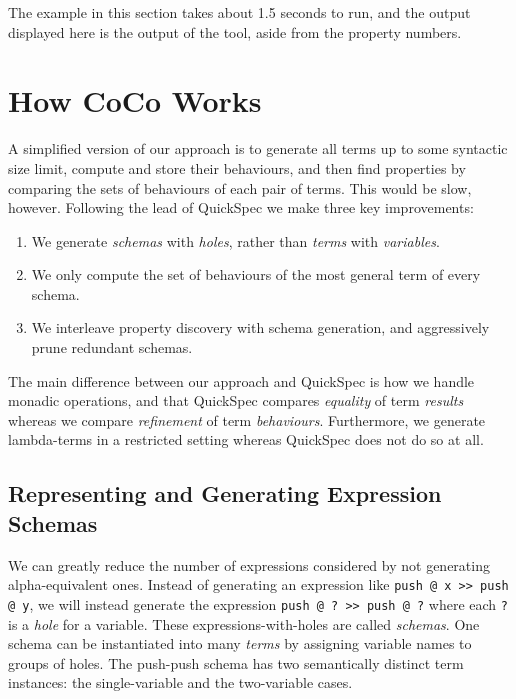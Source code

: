 The example in this section takes about 1.5 seconds to run, and the
output displayed here is the output of the tool, aside from the
property numbers.

\section{How CoCo Works}
\label{sec:coco-hiw}

A simplified version of our approach is to generate all terms up to
some syntactic size limit, compute and store their behaviours, and
then find properties by comparing the sets of behaviours of each pair
of terms.  This would be slow, however.  Following the lead of
QuickSpec\cite{smallbone2017,claessen2010} we make three key
improvements:

\begin{enumerate}
\item We generate \emph{schemas} with \emph{holes}, rather than
  \emph{terms} with \emph{variables}.
\item We only compute the set of behaviours of the most general term
  of every schema.
\item We interleave property discovery with schema generation, and
  aggressively prune redundant schemas.
\end{enumerate}

The main difference between our approach and QuickSpec is how we
handle monadic operations, and that QuickSpec compares \emph{equality}
of term \emph{results} whereas we compare \emph{refinement} of term
\emph{behaviours}.  Furthermore, we generate lambda-terms in a
restricted setting whereas QuickSpec does not do so at all.

\subsection{Representing and Generating Expression Schemas}
\label{sec:coco-hiw-gen}

We can greatly reduce the number of expressions considered by not
generating alpha-equivalent ones.  Instead of generating an expression
like \verb|push @ x >> push @ y|, we will instead generate the
expression \verb|push @ ? >> push @ ?| where each \verb|?| is a
\emph{hole} for a variable.  These expressions-with-holes are called
\emph{schemas}.  One schema can be instantiated into many \emph{terms}
by assigning variable names to groups of holes.  The push-push schema
has two semantically distinct term instances: the single-variable and
the two-variable cases.

